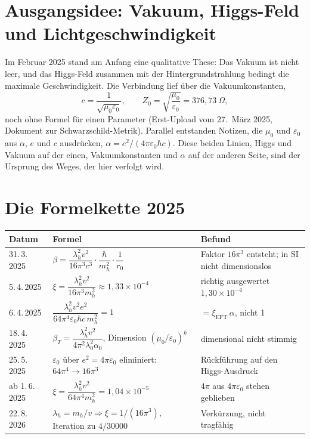 \section{Ausgangsidee: Vakuum, Higgs-Feld und Lichtgeschwindigkeit}

Im Februar 2025 stand am Anfang eine qualitative These: Das Vakuum ist nicht leer, und das
Higgs-Feld zusammen mit der Hintergrundstrahlung bedingt die maximale Geschwindigkeit. Die
Verbindung lief über die Vakuumkonstanten,
\begin{equation}
  c=\frac{1}{\sqrt{\mu_0\varepsilon_0}},\qquad Z_0=\sqrt{\frac{\mu_0}{\varepsilon_0}}=376{,}73\ \Omega ,
\end{equation}
noch ohne Formel für einen Parameter (Erst-Upload vom 27.~März 2025, Dokument zur
Schwarzschild-Metrik). Parallel entstanden Notizen, die $\mu_0$ und $\varepsilon_0$ aus $\alpha$,
$e$ und $c$ ausdrücken, $\alpha=e^2/(4\pi\varepsilon_0\hbar c)$. Diese beiden Linien, Higgs und
Vakuum auf der einen, Vakuumkonstanten und $\alpha$ auf der anderen Seite, sind der Ursprung des
Weges, der hier verfolgt wird.

\section{Die Formelkette 2025}

\begin{center}
\small
\begin{tabular}{@{}p{2.2cm}p{6.4cm}p{5.4cm}@{}}
\toprule
\textbf{Datum} & \textbf{Formel} & \textbf{Befund} \\
\midrule
31.\,3.\,2025 & $\beta=\dfrac{\lambda_h^2v^2}{16\pi^3c^3}\cdot\dfrac{\hbar}{m_h^2}\cdot\dfrac1{r_0}$ & Faktor $16\pi^3$ entsteht; in SI nicht dimensionslos \\[8pt]
5.\,4.\,2025 & $\xi=\dfrac{\lambda_h^2v^2}{16\pi^3m_h^2}\approx1{,}33\times10^{-4}$ & richtig ausgewertet $1{,}30\times10^{-4}$ \\[8pt]
6.\,4.\,2025 & $\dfrac{\lambda_h^2v^2e^2}{64\pi^4\varepsilon_0\hbar c\,m_h^2}=1$ & $=\xi_{\text{EFT}}\,\alpha$, nicht 1 \\[8pt]
18.\,4.\,2025 & $\beta_T=\dfrac{\lambda_h^2v^2}{4\pi^2\lambda_0^2\alpha_0}$, Dimension $(\mu_0/\varepsilon_0)^k$ & dimensional nicht stimmig \\[8pt]
25.\,5.\,2025 & $\varepsilon_0$ über $e^2=4\pi\varepsilon_0$ eliminiert: $64\pi^4\to16\pi^3$ & Rückführung auf den Higgs-Ausdruck \\[8pt]
ab 1.\,6.\,2025 & $\xi=\dfrac{\lambda_h^2v^2}{64\pi^4m_h^2}=1{,}04\times10^{-5}$ & $4\pi$ aus $4\pi\varepsilon_0$ stehen geblieben \\[8pt]
22.\,8.\,2026 & $\lambda_h=m_h/v\Rightarrow\xi=1/(16\pi^3)$, Iteration zu $4/30000$ & Verkürzung, nicht tragfähig \\
\bottomrule
\end{tabular}
\end{center}


